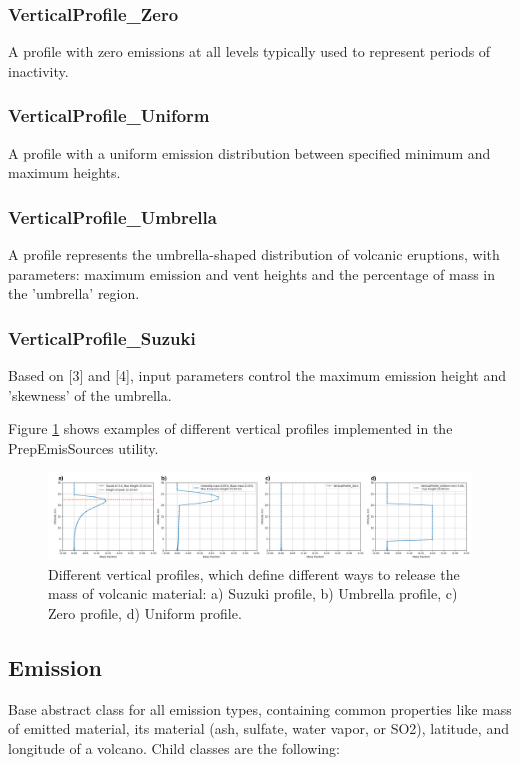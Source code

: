\documentclass{article}
\begin{document}
\subsubsection{VerticalProfile\_Zero}
A profile with zero emissions at all levels typically used to represent periods of inactivity.

\subsubsection{VerticalProfile\_Uniform}
A profile with a uniform emission distribution between specified minimum and maximum heights.

\subsubsection{VerticalProfile\_Umbrella}
A profile represents the umbrella-shaped distribution of volcanic eruptions, with parameters: maximum emission and vent heights and the percentage of mass in the 'umbrella' region.

\subsubsection{VerticalProfile\_Suzuki}
Based on [3] and [4], input parameters control the maximum emission height and 'skewness' of the umbrella.

Figure \ref{fig2} shows examples of different vertical profiles implemented in the PrepEmisSources utility.

\begin{figure}
    \centering
    \includegraphics[width=1\linewidth]{fig2_profiles.png}
    \caption{Different vertical profiles, which define different ways to release the mass of volcanic material: a) Suzuki profile, b) Umbrella profile, c) Zero profile, d) Uniform profile.}
    \label{fig2}
\end{figure}

\subsection{Emission}
Base abstract class for all emission types, containing common properties like mass of emitted material, its material (ash, sulfate, water vapor, or SO2), latitude, and longitude of a volcano.  Child classes are the following:
\end{document}
